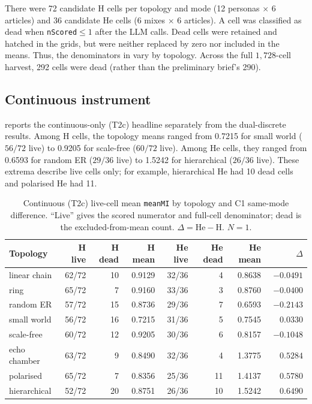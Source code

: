 There were 72 candidate H cells per topology and mode (12 personas $\times$ 6
articles) and 36 candidate He cells (6 mixes $\times$ 6 articles).  A cell was
classified as dead when \texttt{nScored}$\leq 1$ after the LLM calls.  Dead
cells were retained and hatched in the grids, but were neither replaced by
zero nor included in the means.  Thus, the denominators in
 vary by topology.  Across the
full $1{,}728$-cell harvest, 292 cells were dead (rather than the preliminary
brief's 290).

\subsection{Continuous instrument}
\label{sec:results-topology-continuous}

 reports the continuous-only (T2c) headline
separately from the dual-discrete results.  Among H cells, the topology means
ranged from 0.7215 for small world ($56/72$ live) to 0.9205 for scale-free
($60/72$ live).  Among He cells, they ranged from 0.6593 for random ER
($29/36$ live) to 1.5242 for hierarchical ($26/36$ live).  These extrema
describe live cells only; for example, hierarchical He had 10 dead cells and
polarised He had 11.

\begin{table}[t]
\centering
\caption{Continuous (T2c) live-cell mean \texttt{meanMI} by topology and C1
same-mode difference.  ``Live'' gives the scored numerator and full-cell
denominator; dead is the excluded-from-mean count.  $\Delta=\mathrm{He}-\mathrm{H}$.
$N=1$.}
\label{tab:topology-continuous}
\scriptsize
\begin{tabular}{lrrrrrrr}
\toprule
Topology & H live & H dead & H mean & He live & He dead & He mean & $\Delta$ \\
\midrule
linear chain & 62/72 & 10 & 0.9129 & 32/36 & 4  & 0.8638 & $-0.0491$ \\
ring         & 65/72 & 7  & 0.9160 & 33/36 & 3  & 0.8760 & $-0.0400$ \\
random ER    & 57/72 & 15 & 0.8736 & 29/36 & 7  & 0.6593 & $-0.2143$ \\
small world  & 56/72 & 16 & 0.7215 & 31/36 & 5  & 0.7545 & $\phantom{-}0.0330$ \\
scale-free   & 60/72 & 12 & 0.9205 & 30/36 & 6  & 0.8157 & $-0.1048$ \\
echo chamber & 63/72 & 9  & 0.8490 & 32/36 & 4  & 1.3775 & $\phantom{-}0.5284$ \\
polarised    & 65/72 & 7  & 0.8356 & 25/36 & 11 & 1.4137 & $\phantom{-}0.5780$ \\
hierarchical & 52/72 & 20 & 0.8751 & 26/36 & 10 & 1.5242 & $\phantom{-}0.6490$ \\
\bottomrule
\end{tabular}
\end{table}

